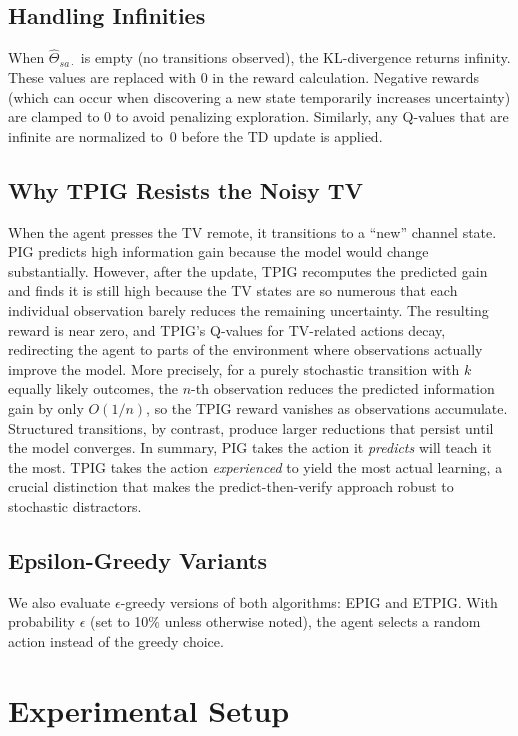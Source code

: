 \documentclass[letterpaper]{article} %
\begin{document}
\subsection{Handling Infinities}

When $\hat{\Theta}_{sa\cdot}$ is empty (no transitions observed),
the KL-divergence returns infinity.  These values are replaced with 0
in the reward calculation.  Negative rewards (which can occur when
discovering a new state temporarily increases uncertainty) are clamped
to 0 to avoid penalizing exploration.  Similarly, any Q-values that
are infinite are normalized to~0 before the TD update is applied.

\subsection{Why TPIG Resists the Noisy TV}

When the agent presses the TV remote, it transitions to a ``new''
channel state.  PIG predicts high information gain because the model
would change substantially.  However, after the update, TPIG
recomputes the predicted gain and finds it is still high because the TV
states are so numerous that each individual observation barely reduces
the remaining uncertainty.  The resulting reward is near zero,
and TPIG's Q-values for TV-related actions decay, redirecting the
agent to parts of the environment where observations actually improve
the model.  More precisely, for a purely stochastic transition with
$k$ equally likely outcomes, the $n$-th observation reduces the
predicted information gain by only $O(1/n)$, so the TPIG reward
vanishes as observations accumulate.  Structured transitions, by
contrast, produce larger reductions that persist until the model
converges.  In summary, PIG takes the action it \emph{predicts} will
teach it the most.  TPIG takes the action \emph{experienced} to yield
the most actual learning, a crucial distinction that makes the
predict-then-verify approach robust to stochastic distractors.

\subsection{Epsilon-Greedy Variants}

We also evaluate $\epsilon$-greedy versions of both algorithms:
EPIG and ETPIG.  With probability $\epsilon$ (set to 10\% unless
otherwise noted), the agent selects a random action instead of the
greedy choice.

\section{Experimental Setup}
\end{document}

